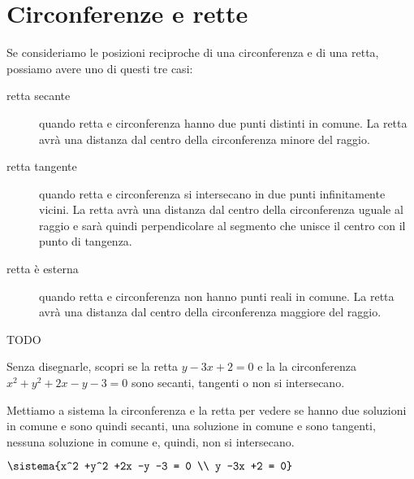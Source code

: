 \section{Circonferenze e rette}
\label{sec:circ_circrette}

Se consideriamo le posizioni reciproche di una circonferenza e di una retta, 
possiamo avere uno di questi tre casi:

\begin{description} %
 \item [retta secante] 
quando retta e circonferenza hanno due punti distinti in comune. La retta avrà 
una distanza dal centro della circonferenza minore del raggio.
 \item [retta tangente]
quando retta e circonferenza si intersecano in due punti infinitamente vicini. 
La retta avrà una distanza dal centro della circonferenza uguale al raggio e 
sarà quindi perpendicolare al segmento che unisce il centro con il punto di 
tangenza.
 \item [retta è esterna]
quando retta e circonferenza non hanno punti reali in comune. La retta avrà una 
distanza dal centro della circonferenza maggiore del raggio. 
\end{description}

\noindent\begin{minipage}{.48\textwidth}
TODO
\end{minipage}
\hfill
\begin{minipage}{.48\textwidth}
\begin{center}
\begin{inaccessibleblock}
\end{inaccessibleblock}
\end{center}
\end{minipage}


\begin{esempio}
Senza disegnarle, scopri se la retta \(y -3x +2 = 0\) 
e la la circonferenza \(x^2 +y^2 +2x -y -3 = 0\) sono secanti, 
tangenti o non si intersecano.

Mettiamo a sistema la circonferenza  e la retta per vedere se hanno due 
soluzioni in comune e sono quindi secanti, una soluzione in comune e sono 
tangenti, nessuna soluzione in comune e, quindi, non si intersecano.

\(\sistema{x^2 +y^2 +2x -y -3 = 0 \\ y -3x +2 = 0}\)

\end{esempio}

